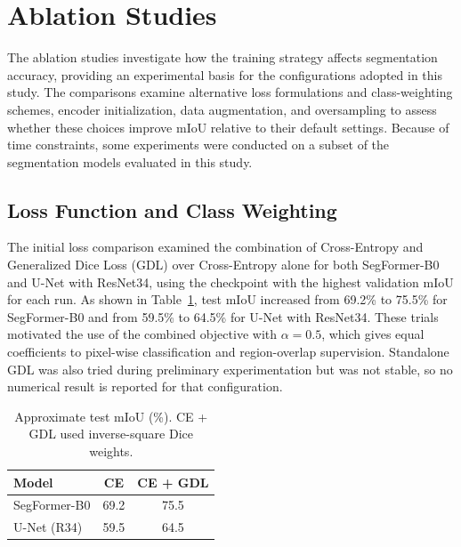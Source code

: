 \section{Ablation Studies}
\label{sec:segmentation-ablation-studies}

The ablation studies investigate how the training strategy affects segmentation accuracy, providing an experimental basis for the configurations adopted in this study. The comparisons examine alternative loss formulations and class-weighting schemes, encoder initialization, data augmentation, and oversampling to assess whether these choices improve mIoU relative to their default settings. Because of time constraints, some experiments were conducted on a subset of the segmentation models evaluated in this study.

\subsection{Loss Function and Class Weighting}

The initial loss comparison examined the combination of Cross-Entropy and Generalized Dice Loss (GDL) over Cross-Entropy alone for both SegFormer-B0 and U-Net with ResNet34, using the checkpoint with the highest validation mIoU for each run. As shown in Table~\ref{tab:s5mars-exploratory-loss-ablation}, test mIoU increased from 69.2\% to 75.5\% for SegFormer-B0 and from 59.5\% to 64.5\% for U-Net with ResNet34. These trials motivated the use of the combined objective with \(\alpha = 0.5\), which gives equal coefficients to pixel-wise classification and region-overlap supervision. Standalone GDL was also tried during preliminary experimentation but was not stable, so no numerical result is reported for that configuration.

\begin{table}[ht!]
    \centering
    \small
    \setlength{\tabcolsep}{5pt}
    \begin{tabular}{@{}l c c@{}}
        \toprule
        \textbf{Model}   & \textbf{CE} & \textbf{CE + GDL} \\
        \midrule
        \midrule
        SegFormer-B0     & 69.2        & 75.5              \\
        U-Net (R34) & 59.5        & 64.5              \\
        \bottomrule
    \end{tabular}
    \vspace{5mm}
    \caption{Approximate test mIoU (\%). CE + GDL used inverse-square Dice weights.}
    \label{tab:s5mars-exploratory-loss-ablation}
\end{table}


